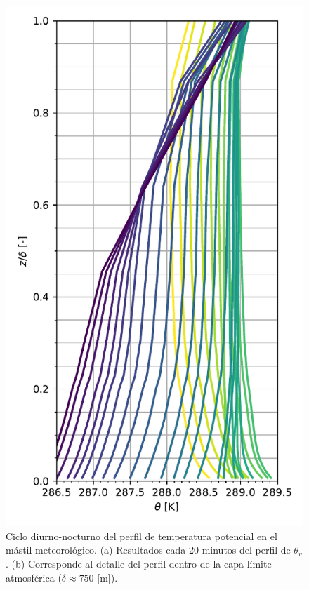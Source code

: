 \begin{figure}[H]
\begin{minipage}{0.5\linewidth}
	\end{minipage}%
	\begin{minipage}{0.5\linewidth}
		\centering
		\includegraphics[width=0.86\linewidth,trim={0cm 5mm 0cm 0cm},clip]{Imagenes/06/hov/temp_profile}%
	\end{minipage}%
	
	\caption{Ciclo diurno-nocturno del perfil de temperatura potencial en el mástil meteorológico. (a) Resultados cada 20 minutos del perfil de $\theta_v$. (b) Corresponde al detalle del perfil dentro de la capa límite atmosférica ($\delta \approx 750$ [m]).}
	\label{fig:06_hov_pbl}
\end{figure}

